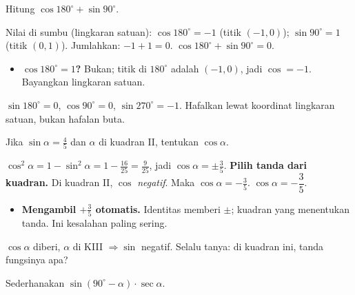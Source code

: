 \begin{soalbox}{}
Hitung $\cos180^\circ+\sin90^\circ$.
\end{soalbox}

\jawab
{} Nilai di sumbu (lingkaran satuan): $\cos180^\circ=-1$ (titik
$(-1,0)$); $\sin90^\circ=1$ (titik $(0,1)$).
 Jumlahkan: $-1+1=0$.
\jadi $\cos180^\circ+\sin90^\circ=0$.

\begin{jebakan}
\begin{itemize}[leftmargin=*,topsep=2pt]
  \item \textbf{$\cos180^\circ=1$?} Bukan; titik di $180^\circ$ adalah $(-1,0)$,
  jadi $\cos=-1$. Bayangkan lingkaran satuan.
\end{itemize}
\end{jebakan}

\begin{variasi}
$\sin180^\circ=0$, $\cos90^\circ=0$, $\sin270^\circ=-1$. Hafalkan lewat
koordinat lingkaran satuan, bukan hafalan buta.
\end{variasi}

\begin{soalbox}{}
Jika $\sin\alpha=\tfrac45$ dan $\alpha$ di kuadran II, tentukan $\cos\alpha$.
\end{soalbox}

\jawab
{} $\cos^2\alpha=1-\sin^2\alpha=1-\frac{16}{25}=\frac{9}{25}$, jadi
$\cos\alpha=\pm\frac35$.
 \textbf{Pilih tanda dari kuadran.} Di kuadran II, $\cos$
\emph{negatif}. Maka $\cos\alpha=-\frac35$.
\jadi $\cos\alpha=-\dfrac35$.

\begin{jebakan}
\begin{itemize}[leftmargin=*,topsep=2pt]
  \item \textbf{Mengambil $+\frac35$ otomatis.} Identitas memberi $\pm$; kuadran
  yang menentukan tanda. Ini kesalahan paling sering.
\end{itemize}
\end{jebakan}

\begin{variasi}
$\cos\alpha$ diberi, $\alpha$ di KIII $\Rightarrow\sin$ negatif. Selalu tanya:
di kuadran ini, tanda fungsinya apa?
\end{variasi}

\begin{soalbox}{}
Sederhanakan $\sin(90^\circ-\alpha)\cdot\sec\alpha$.
\end{soalbox}

